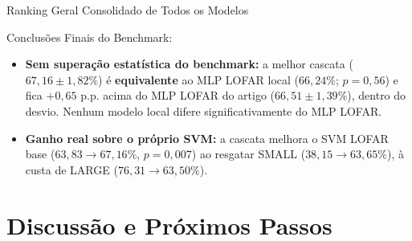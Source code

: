 \documentclass[aspectratio=169]{beamer}
\begin{document}
\begin{frame}{Ranking Geral Consolidado de Todos os Modelos}
    \vspace{0.1cm}
    \begin{block}{\small Conclus\~{o}es Finais do Benchmark:}
        \scriptsize
        \begin{itemize}
            \setlength{\itemsep}{1pt}
            \item \textbf{Sem supera\c{c}\~{a}o estat\'{i}stica do benchmark:} a melhor cascata ($67,16 \pm 1,82\%$) \'{e} \textbf{equivalente} ao MLP LOFAR local ($66,24\%$; $p=0,56$) e fica $+0,65$ p.p. acima do MLP LOFAR do artigo ($66,51 \pm 1,39\%$), dentro do desvio. Nenhum modelo local difere significativamente do MLP LOFAR.
            \item \textbf{Ganho real sobre o pr\'{o}prio SVM:} a cascata melhora o SVM LOFAR base ($63,83 \to 67,16\%$, $p=0,007$) ao resgatar SMALL ($38,15 \to 63,65\%$), \`{a} custa de LARGE ($76,31 \to 63,50\%$).
        \end{itemize}
    \end{block}
\end{frame}

\section{Discuss\~{a}o e Pr\'{o}ximos Passos}
\end{document}
